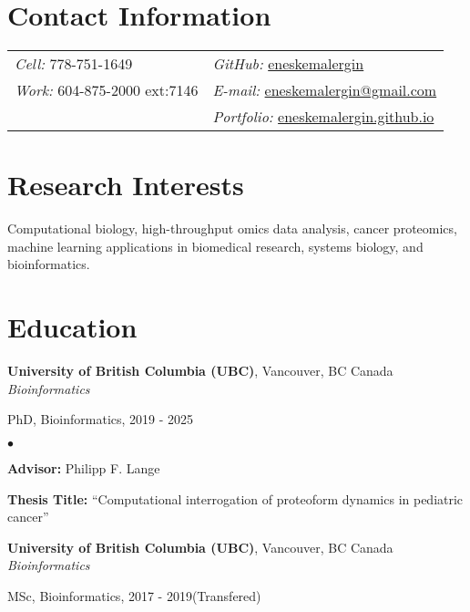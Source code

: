 \documentclass[margin,line]{res}
\newenvironment{list1}{
  \begin{list}{\ding{113}}{%
      \setlength{\itemsep}{0in}
      \setlength{\parsep}{0in} \setlength{\parskip}{0in}
      \setlength{\topsep}{0in} \setlength{\partopsep}{0in}
      \setlength{\leftmargin}{0.17in}}}{\end{list}}
\newenvironment{list2}{
  \begin{list}{$\bullet$}{%
      \setlength{\itemsep}{0in}
      \setlength{\parsep}{0in} \setlength{\parskip}{0in}
      \setlength{\topsep}{0in} \setlength{\partopsep}{0in}
      \setlength{\leftmargin}{0.2in}}}{\end{list}}
\begin{document}

\begin{resume}
\section{\sc Contact Information}
\vspace{.05in}
\begin{tabular}{@{}p{2.3in}p{3.5in}}
{\it Cell:} 778-751-1649            & \hfill {\it GitHub:}  \href{https://github.com/eneskemalergin}{eneskemalergin} \\
{\it Work:} 604-875-2000 ext:7146   & \hfill {\it E-mail:}  \href{mailto:eneskemalergin@gmail.com}{eneskemalergin@gmail.com}\\
                                    & \hfill {\it Portfolio:}  \href{eneskemalergin.github.io}{eneskemalergin.github.io} \\
\end{tabular}


\section{\sc Research Interests}
Computational biology, high-throughput omics data analysis, cancer proteomics, machine learning applications in biomedical research, systems biology, and bioinformatics.

\section{\sc Education}

{\bf University of British Columbia (UBC)}, Vancouver, BC Canada\\
{\em Bioinformatics}
\begin{list1}
\item[]  PhD, Bioinformatics, 2019 - 2025
\begin{list2}
\vspace*{.05in}
\item {\bf Advisor:}  Philipp F. Lange
\item {\bf Thesis Title:}  ``Computational interrogation of proteoform dynamics in pediatric cancer''
\end{list2}
\end{list1}

{\bf University of British Columbia (UBC)}, Vancouver, BC Canada\\
{\em Bioinformatics}
\begin{list1}
\item[]  MSc, Bioinformatics, 2017 - 2019(Transfered)
\end{list1}


\end{resume}
\end{document}
